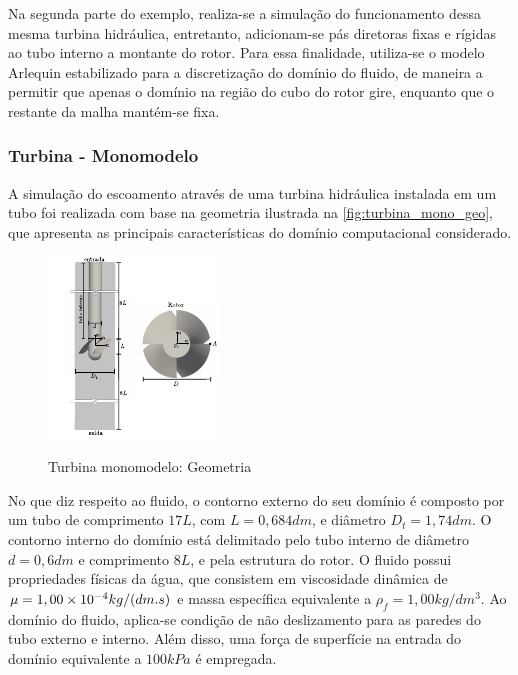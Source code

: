 Na segunda parte do exemplo, realiza-se a simulação do funcionamento dessa mesma turbina hidráulica, entretanto, adicionam-se pás diretoras fixas e rígidas ao tubo interno a montante do rotor. Para essa finalidade, utiliza-se o modelo Arlequin estabilizado para a discretização do domínio do fluido, de maneira a permitir que apenas o domínio na região do cubo do rotor gire, enquanto que o restante da malha mantém-se fixa.   

\subsubsection{Turbina - Monomodelo}\label{capitulo:Cap7:exemplos:Turbina:Mono}

A simulação do escoamento através de uma turbina hidráulica instalada em um tubo foi realizada com base na geometria ilustrada na \autoref{fig:turbina_mono_geo}, que apresenta as principais características do domínio computacional considerado.

\begin{figure}[!htbp]
	\caption{Turbina monomodelo: Geometria}
	\centering 
	\includegraphics[scale=3.0,trim=0cm 0cm 0cm 0cm, clip=true]{Imagens/Cap7/turbina_mono_geo.pdf}	
	\label{fig:turbina_mono_geo}
\end{figure}

No que diz respeito ao fluido, o contorno externo do seu domínio é composto por um tubo de comprimento $17L$, com $L = 0,684dm$, e diâmetro $D_t = 1,74dm$. O contorno interno do domínio está delimitado pelo tubo interno de diâmetro $d = 0,6dm$ e comprimento $8L$, e pela estrutura do rotor. O fluido possui propriedades físicas da água, que consistem em viscosidade dinâmica de $\mu=1,00\times10^{-4} kg/(dm.s)$ e massa específica equivalente a $\rho_{f} = 1,00 kg/dm^3 $. Ao domínio do fluido, aplica-se condição de não deslizamento para as paredes do tubo externo e interno. Além disso, uma força de superfície na entrada do domínio equivalente a $100kPa$ é empregada.

